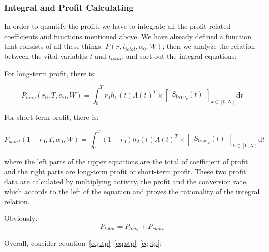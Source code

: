 \documentclass[./main.tex]{subfiles}
\begin{document}
    \subsubsection{Integral and Profit Calculating}
        In order to quantify the profit, we have to integrate all the profit-related coefficients and functions
        mentioned above.
        We have already defined a function that consists of all these things: $P\left( r, t_{total}, \alpha_0, W
\right)$; then we analyze the relation between the vital variables $t$ and $t_{total}$, and sort out the integral
equations:

        For long-term profit, there is:

        \begin{equation}
            \label{eq:ltp}
            P_{long}\left(r_0,T,\alpha_0,W\right) = \int_0^T r_0 h_1\left(t\right){A
            \left(t\right)}^T\times
            \begin{bmatrix}
                S_{\mathrm{type}_k}\left(t\right)
            \end{bmatrix}_{k\in \left[0,N\right)}
            \mathrm{d}t
        \end{equation}

        For short-term profit, there is:

        \begin{equation}
            \label{eq:stp}
            P_{short}\left(1-r_0,T,\alpha_0,W\right) = \int_0^T \left( 1-r_0 \right)h_2\left(t\right){A
            \left(t\right)}^T\times
            \begin{bmatrix}
                S_{\mathrm{type}_k}\left(t\right)
            \end{bmatrix}_{k\in \left[0,N\right)}
            \mathrm{d}t
        \end{equation}

        where the left parts of the upper equations are the total of coefficient of profit and the right parts are long-term profit or short-term profit.
        These two profit data are calculated by multiplying activity, the profit and the conversion
rate, which accords to the left of the equation and proves the rationality of the integral relation.

        Obviously:
        \begin{equation}
            \label{eq:tp}
            P_{total} = P_{long} + P_{short}
        \end{equation}

        Overall, consider equation~\eqref{eq:ltp}~\eqref{eq:stp}~\eqref{eq:tp}:
\end{document}
